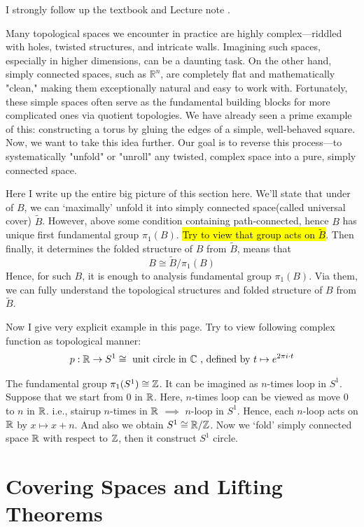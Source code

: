 \documentclass[12pt, a4paper, twoside]{article}
\newcommand{\BC}{{\mathbb {C}}} \newcommand{\BD}{{\mathbb {D}}}
\theoremstyle{plain}
\begin{document}
I strongly follow up the textbook \cite{munkres} and Lecture note \cite{Lecture02}.

Many topological spaces we encounter in practice are highly complex—riddled with holes, twisted structures, and intricate walls. Imagining such spaces, especially in higher dimensions, can be a daunting task. On the other hand, simply connected spaces, such as $\mathbb{R}^n$, are completely flat and mathematically "clean," making them exceptionally natural and easy to work with. 
Fortunately, these simple spaces often serve as the fundamental building blocks for more complicated ones via quotient topologies. We have already seen a prime example of this: constructing a torus by gluing the edges of a simple, well-behaved square. Now, we want to take this idea further. Our goal is to reverse this process—to systematically "unfold" or "unroll" any twisted, complex space into a pure, simply connected space.

Here I write up the entire big picture of this section here. 
We'll state that under  of $B$, we can \lq maximally' unfold it into simply connected space(called universal cover) $\tilde{B}$. 
However, above some condition containing path-connected, hence $B$ has unique first fundamental group $\pi_1(B)$. 
\hl{Try to view that group acts on $\tilde{B}$}. 
Then finally, it determines the folded structure of $B$ from $\tilde{B}$, means that 
\[B \cong \tilde{B}/\pi_1(B)\]
Hence, for such  $B$, it is enough to analysis fundamental group $\pi_1(B)$. 
Via them, we can fully understand the topological structures and folded structure of $B$ from $\tilde{B}$. 

Now I give very explicit example in this page. 
Try to view following complex function as topological manner: 
\[p: \BR \rightarrow S^1 \cong \text{ unit circle in $\BC$ , defined by } t \mapsto e^{2\pi i \cdot t}\]

The fundamental group $\pi_1(S^1) \cong {\mathbb {Z}}$. It can be imagined as $n$-times loop in $S^1$. 
Suppose that we start from $0$ in ${\mathbb {R}}$. 
Here, $n$-times loop can be viewed as move $0$ to $n$ in ${\mathbb {R}}$. i.e., stairup $n$-times in ${\mathbb {R}}$ $\implies$ $n$-loop in $S^1$. 
Hence, each $n$-loop acts on ${\mathbb {R}}$ by $x \mapsto x + n$. 
And also we obtain $S^1 \cong {\mathbb {R}}/{\mathbb {Z}}$. 
Now we \lq fold' simply connected space ${\mathbb {R}}$ with respect to ${\mathbb {Z}}$, 
then it construct $S^1$ circle. 

\newpage 

\section{Covering Spaces and Lifting Theorems}
\end{document}
